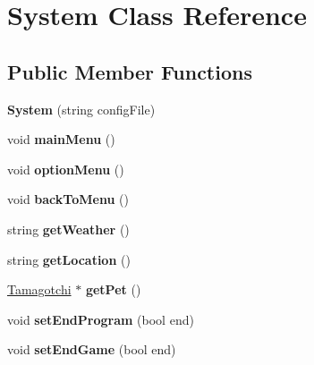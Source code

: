 \hypertarget{class_system}{\section{System Class Reference}
\label{class_system}
}
\subsection*{Public Member Functions}
\begin{DoxyCompactItemize}
\item 
\hypertarget{class_system_a4aec7c704cb016829a8101a444c86ce2}{{\bfseries System} (string config\+File)}\label{class_system_a4aec7c704cb016829a8101a444c86ce2}

\item 
\hypertarget{class_system_ad3f78f5e6cd941212a85d938b41b40e4}{void {\bfseries main\+Menu} ()}\label{class_system_ad3f78f5e6cd941212a85d938b41b40e4}

\item 
\hypertarget{class_system_a8b66f7cc92e460587e784297de7702fa}{void {\bfseries option\+Menu} ()}\label{class_system_a8b66f7cc92e460587e784297de7702fa}

\item 
\hypertarget{class_system_af3027e0a0810ce5d77cfc39789351778}{void {\bfseries back\+To\+Menu} ()}\label{class_system_af3027e0a0810ce5d77cfc39789351778}

\item 
\hypertarget{class_system_aeaacdfd4fd779dacca613fed2d611bd7}{string {\bfseries get\+Weather} ()}\label{class_system_aeaacdfd4fd779dacca613fed2d611bd7}

\item 
\hypertarget{class_system_a83bcc6fc828f3cb73a872f3eb4d30efe}{string {\bfseries get\+Location} ()}\label{class_system_a83bcc6fc828f3cb73a872f3eb4d30efe}

\item 
\hypertarget{class_system_a19869ea2951861489584d524ddb807a8}{\hyperlink{class_tamagotchi}{Tamagotchi} $\ast$ {\bfseries get\+Pet} ()}\label{class_system_a19869ea2951861489584d524ddb807a8}

\item 
\hypertarget{class_system_a32b34662cf4dc856379d7d764d4c9a5d}{void {\bfseries set\+End\+Program} (bool end)}\label{class_system_a32b34662cf4dc856379d7d764d4c9a5d}

\item 
\hypertarget{class_system_a2a008edabf06c463f1cb77a4285df977}{void {\bfseries set\+End\+Game} (bool end)}\label{class_system_a2a008edabf06c463f1cb77a4285df977}


\end{DoxyCompactItemize}
